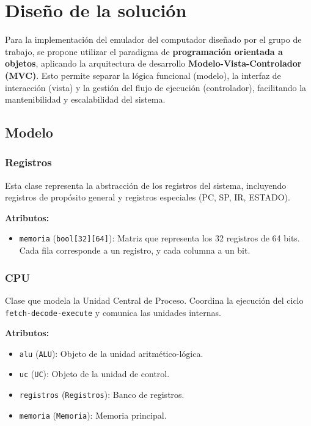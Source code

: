 \documentclass{article}
\begin{document}
\section{Diseño de la solución}\label{sec:dis}

Para la implementación del emulador del computador diseñado por el grupo de trabajo, se propone
utilizar el paradigma de \textbf{programación orientada a objetos}, aplicando la arquitectura de
desarrollo \textbf{Modelo-Vista-Controlador (MVC)}. Esto permite separar la lógica funcional
(modelo), la interfaz de interacción (vista) y la gestión del flujo de ejecución (controlador),
facilitando la mantenibilidad y escalabilidad del sistema.

\subsection{Modelo}

\subsubsection*{Registros}

Esta clase representa la abstracción de los registros del sistema, incluyendo registros de
propósito general y registros especiales (PC, SP, IR, ESTADO).

\textbf{Atributos:}
\begin{itemize}
  \item \texttt{memoria} (\texttt{bool[32][64]}): Matriz que representa los 32 registros
        de 64 bits. Cada fila corresponde a un registro, y cada columna a un bit.
\end{itemize}

\subsubsection*{CPU}

Clase que modela la Unidad Central de Proceso. Coordina la ejecución del ciclo
\texttt{fetch-decode-execute} y comunica las unidades internas.

\textbf{Atributos:}
\begin{itemize}
  \item \texttt{alu} (\texttt{ALU}): Objeto de la unidad aritmético-lógica.
  \item \texttt{uc} (\texttt{UC}): Objeto de la unidad de control.
  \item \texttt{registros} (\texttt{Registros}): Banco de registros.
  \item \texttt{memoria} (\texttt{Memoria}): Memoria principal.
\end{itemize}
\end{document}
